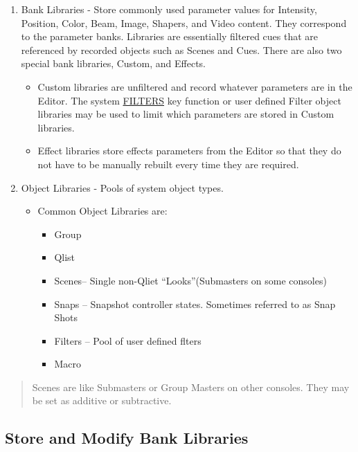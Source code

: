 \documentclass[
]{article}
\begin{document}
\begin{enumerate}
\def\labelenumi{\arabic{enumi}.}
\item
  Bank Libraries - Store commonly used parameter values for Intensity, Position, Color, Beam, Image, Shapers, and Video content. They correspond to the parameter banks. Libraries are essentially filtered cues that are referenced by recorded objects such as Scenes and Cues. There are also two special bank libraries, Custom, and Effects.

  \begin{itemize}
  \item
    Custom libraries are unfiltered and record whatever parameters are in the Editor. The system \protect\hyperlink{filters}{FILTERS} key function or user defined Filter object libraries may be used to limit which parameters are stored in Custom libraries.
  \item
    Effect libraries store effects parameters from the Editor so that they do not have to be manually rebuilt every time they are required.
  \end{itemize}
\item
  Object Libraries - Pools of system object types.

  \begin{itemize}
  \item
    Common Object Libraries are:

    \begin{itemize}
    \item
      Group
    \item
      Qlist
    \item
      Scenes-- Single non-Qliet ``Looks''(Submasters on some consoles)
    \item
      Snaps -- Snapshot controller states. Sometimes referred to as Snap Shots
    \item
      Filters -- Pool of user defined flters
    \item
      Macro
    \end{itemize}
  \end{itemize}
\end{enumerate}

\begin{quote}
Scenes are like Submasters or Group Masters on other consoles. They may be set as additive or subtractive.
\end{quote}

\hypertarget{store-and-modify-bank-libraries}{%
\subsection{Store and Modify Bank Libraries}\label{store-and-modify-bank-libraries}}
\end{document}
